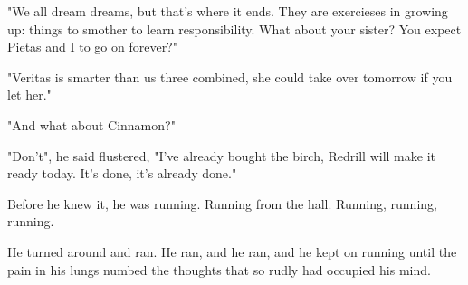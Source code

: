 "We all dream dreams, but that's where it ends. They are exercieses in growing up: things to smother to learn responsibility. What about your sister? You expect Pietas and I to go on forever?"

"Veritas is smarter than us three combined, she could take over tomorrow if you let her."

"And what about Cinnamon?"

"Don't", he said flustered, "I've already bought the birch, Redrill will make it ready today. It's done, it's already done."

Before he knew it, he was running. Running from the hall. Running, running, running.

He turned around and ran.
He ran, and he ran, and he kept on running until the pain in his lungs numbed the thoughts that so rudly had occupied his mind.



